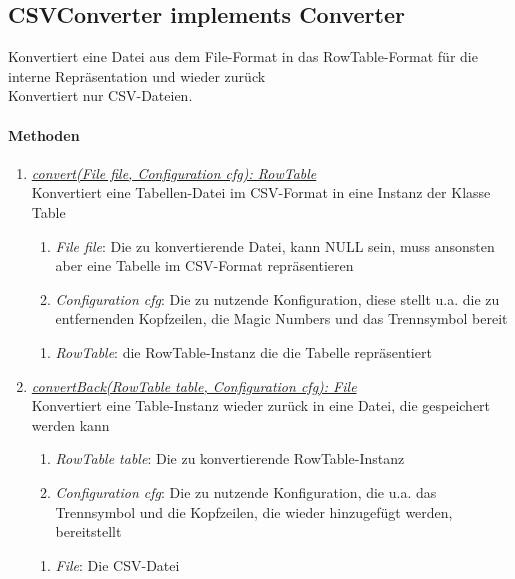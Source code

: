 \subsection{CSVConverter implements Converter}
Konvertiert eine Datei aus dem File-Format in das RowTable-Format für die interne Repräsentation und wieder zurück \\
Konvertiert nur CSV-Dateien. \\

\paragraph{Methoden}

\begin{enumerate}[+]
	\item \underline{\textit{convert(File file, Configuration cfg): RowTable}} \\
	Konvertiert eine Tabellen-Datei im CSV-Format in eine Instanz der Klasse Table
	
	\begin{enumerate}[$\bullet$]
		\item \textit{File file}: Die zu konvertierende Datei, kann NULL sein, muss ansonsten aber eine Tabelle im CSV-Format repräsentieren
		\item \textit{Configuration cfg}: Die zu nutzende Konfiguration, diese stellt u.a. die zu entfernenden Kopfzeilen, die Magic Numbers und das Trennsymbol bereit
	\end{enumerate}
	\vspace{-0.2cm}
	\begin{enumerate}[$\circ$]
		\item \textit{RowTable}: die RowTable-Instanz die die Tabelle repräsentiert
	\end{enumerate}
	
	\item \underline{\textit{convertBack(RowTable table, Configuration cfg): File}} \\
	Konvertiert eine Table-Instanz wieder zurück in eine Datei, die gespeichert werden kann
	\begin{enumerate}[$\bullet$]
		\item \textit{RowTable table}: Die zu konvertierende RowTable-Instanz
		\item \textit{Configuration cfg}: Die zu nutzende Konfiguration, die u.a. das Trennsymbol und die Kopfzeilen, die wieder hinzugefügt werden, bereitstellt
	\end{enumerate}
	\vspace{-0.2cm}
	\begin{enumerate}[$\circ$]
		\item \textit{File}: Die CSV-Datei
	\end{enumerate}


\end{enumerate}
